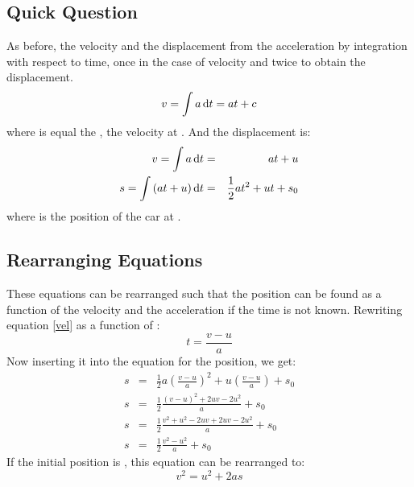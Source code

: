 \subsection*{Quick Question}
As before, the velocity and the displacement from the acceleration by integration with respect to time, once in the case of velocity and twice to obtain the displacement.
\begin{equation}
v = \int a \operatorname{d}\! t = at + c
\end{equation}
where  is equal the , the velocity at . And the displacement is:
\begin{eqnarray}
v = \int a \operatorname{d}\! t &=& at + u \label{vel} \\ 
s = \int \left(at + u\right) \operatorname{d}\! t &=& \frac{1}{2} a t^2 + u t + s_0 \label{s}
\end{eqnarray}
where  is the position of the car at . 

\subsection{Rearranging Equations}
These equations can be rearranged such that the position can be found as a function of the velocity and the acceleration if the time is not known. Rewriting equation \ref{vel} as a function of :
\begin{equation}
t = \frac{v-u}{a}
\end{equation}
Now inserting it into the equation for the position, we get:
\begin{eqnarray}
s &=& \frac{1}{2} a \left(\frac{v-u}{a}\right)^2 + u\left(\frac{v-u}{a}\right) + s_0\nonumber \\
s &=& \frac{1}{2}\frac{(v-u)^2 + 2uv - 2u^2}{a} + s_0 \nonumber\\
s &=& \frac{1}{2}\frac{v^2 + u^2 - 2uv + 2uv - 2u^2}{a} + s_0 \nonumber\\
s &=& \frac{1}{2} \frac{v^2 - u^2}{a} + s_0
\end{eqnarray}
If the initial position is , this equation can be rearranged to:
\begin{equation}
v^2 = u^2 + 2as
\end{equation}

 
 
